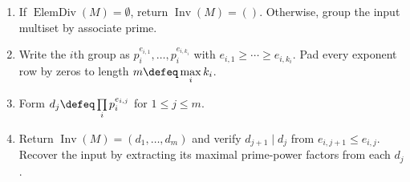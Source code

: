 \begin{method} \label{meth:elementary-divisors-to-invariant-factors} 
\begin{enumerate}[label=(\roman*)]
\setlength{\itemsep}{0pt}
\item If $\operatorname{ElemDiv}(M)=\emptyset$, return $\operatorname{Inv}(M)=()$. Otherwise, group the input multiset by associate prime.
\item Write the $i$th group as $p_i^{e_{i,1}},\ldots,p_i^{e_{i,k_i}}$ with $e_{i,1}\geq\cdots\geq e_{i,k_i}$. Pad every exponent row by zeros to length $m\defeq\max\limits_i k_i$.
\item Form $d_j\defeq\prod\limits_i p_i^{e_{i,j}}$ for $1\leq j\leq m$.
\item Return $\operatorname{Inv}(M)=(d_1,\ldots,d_m)$ and verify $d_{j+1}\mid d_j$ from $e_{i,j+1}\leq e_{i,j}$.\\
Recover the input by extracting its maximal prime-power factors from each $d_j$.
\end{enumerate}
\end{method}

